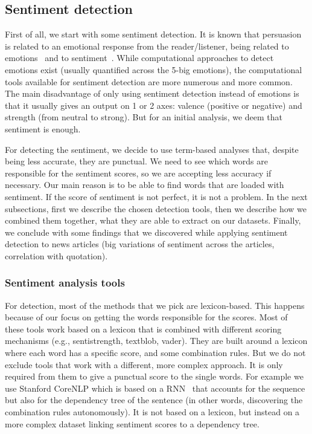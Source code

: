 \subsection{Sentiment detection}
\label{ssec:lp_techniques_sentiment}

First of all, we start with some sentiment detection. It is known that persuasion is related to an emotional response from the reader/listener, being related to emotions~\citep{rocklage2018persuasion,petty2015emotion,desteno2004discrete} and to sentiment~\citep{gatti2014sentiment}.
While computational approaches to detect emotions exist (usually quantified across the 5-big emotions), the computational tools available for sentiment detection are more numerous and more common. The main disadvantage of only using sentiment detection instead of emotions is that it usually gives an output on 1 or 2 axes: valence (positive or negative) and strength (from neutral to strong). But for an initial analysis, we deem that sentiment is enough.

For detecting the sentiment, we decide to use term-based analyses that, despite being less accurate, they are punctual. We need to see which words are responsible for the sentiment scores, so we are accepting less accuracy if necessary. Our main reason is to be able to find words that are loaded with sentiment. If the score of sentiment is not perfect, it is not a problem.
In the next subsections, first we describe the chosen detection tools, then we describe how we combined them together, what they are able to extract on our datasets. Finally, we conclude with some findings that we discovered while applying sentiment detection to news articles (big variations of sentiment across the articles, correlation with quotation).

\subsubsection{\statusgreen Sentiment analysis tools}

For detection, most of the methods that we pick are lexicon-based. This happens because of our focus on getting the words responsible for the scores. Most of these tools work based on a lexicon that is combined with different scoring mechanisms (e.g., sentistrength, textblob, vader). They are built around a lexicon where each word has a specific score, and some combination rules. But we do not exclude tools that work with a different, more complex approach. It is only required from them to give a punctual score to the single words. For example we use Stanford CoreNLP which is based on a RNN~\citep{socher2013recursive} that accounts for the sequence but also for the dependency tree of the sentence (in other words, discovering the combination rules autonomously). It is not based on a lexicon, but instead on a more complex dataset linking sentiment scores to a dependency tree.

